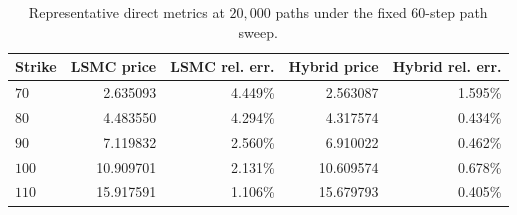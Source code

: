 \begin{table}[htbp]
\centering
\caption{Representative direct metrics at $20{,}000$ paths under the fixed 60-step path sweep.}
\label{tab:bgk_r02_calibrated_t1_nex12-path60-path20k}
\begin{tabular}{lrrrr}
\toprule
Strike & LSMC price & LSMC rel. err. & Hybrid price & Hybrid rel. err. \\
\midrule
$70$ & 2.635093 & 4.449\% & 2.563087 & 1.595\% \\
$80$ & 4.483550 & 4.294\% & 4.317574 & 0.434\% \\
$90$ & 7.119832 & 2.560\% & 6.910022 & 0.462\% \\
$100$ & 10.909701 & 2.131\% & 10.609574 & 0.678\% \\
$110$ & 15.917591 & 1.106\% & 15.679793 & 0.405\% \\
\bottomrule
\end{tabular}
\end{table}
